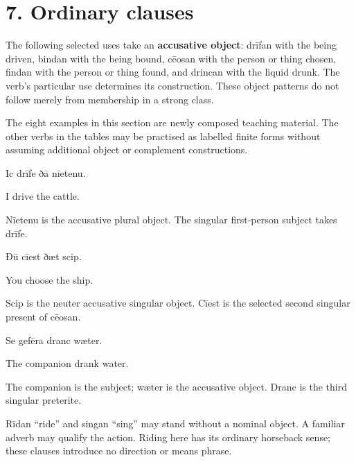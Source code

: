 \section*{7. Ordinary clauses}

The following selected uses take an \textbf{accusative object}: drīfan with the being driven, bindan with the being bound, cēosan with the person or thing chosen, findan with the person or thing found, and drincan with the liquid drunk. The verb’s particular use determines its construction. These object patterns do not follow merely from membership in a strong class.

The eight examples in this section are newly composed teaching material. The other verbs in the tables may be practised as labelled finite forms without assuming additional object or complement constructions.

Ic drīfe ðā nīetenu.

I drive the cattle.

Nīetenu is the accusative plural object. The singular first-person subject takes drīfe.

Ðū cīest ðæt scip.

You choose the ship.

Scip is the neuter accusative singular object. Cīest is the selected second singular present of cēosan.

Se gefēra dranc wæter.

The companion drank water.

The companion is the subject; wæter is the accusative object. Dranc is the third singular preterite.

Rīdan “ride” and singan “sing” may stand without a nominal object. A familiar adverb may qualify the action. Riding here has its ordinary horseback sense; these clauses introduce no direction or means phrase.

